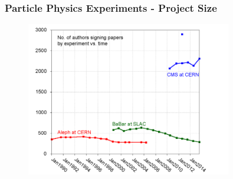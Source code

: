 \begin{frame}
\frametitle{Particle Physics Experiments - Project Size}

\begin{figure}[htbp]
\begin{center}
\includegraphics[width=0.8\textwidth]{images/authors-aleph-babar-cms-by-time.png}
\end{center}
\end{figure}


\end{frame}


